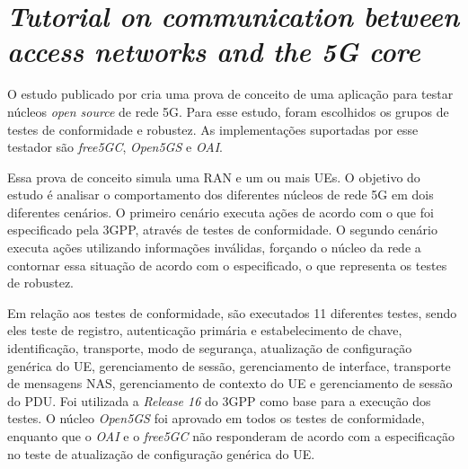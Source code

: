 \section{\textit{Tutorial on communication between access networks and the 5G core}}
\label{sec:Dominato}

O estudo publicado por  cria uma prova de conceito de uma aplicação para testar núcleos \textit{open source} de rede 5G.
Para esse estudo, foram escolhidos os grupos de testes de conformidade e robustez.
As implementações suportadas por esse testador são \textit{free5GC}, \textit{Open5GS} e \textit{OAI}.

Essa prova de conceito simula uma RAN e um ou mais UEs.
O objetivo do estudo é analisar o comportamento dos diferentes núcleos de rede 5G em dois diferentes cenários.
O primeiro cenário executa ações de acordo com o que foi especificado pela 3GPP, através de testes de conformidade.
O segundo cenário executa ações utilizando informações inválidas, forçando o núcleo da rede a contornar essa situação de acordo com o especificado, o que representa os testes de robustez.

Em relação aos testes de conformidade, são executados 11 diferentes testes, sendo eles teste de registro, autenticação primária e estabelecimento de chave, identificação, transporte, modo de segurança, atualização de configuração genérica do UE, gerenciamento de sessão, gerenciamento de interface, transporte de mensagens NAS, gerenciamento de contexto do UE e gerenciamento de sessão do PDU.
Foi utilizada a \textit{Release 16} do 3GPP como base para a execução dos testes.
O núcleo \textit{Open5GS} foi aprovado em todos os testes de conformidade, enquanto que o \textit{OAI} e o \textit{free5GC} não responderam de acordo com a especificação no teste de atualização de configuração genérica do UE.

